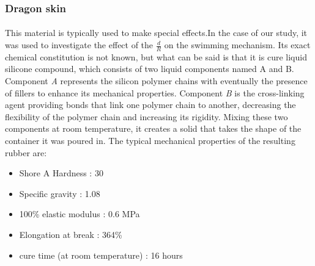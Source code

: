 \subsubsection{Dragon skin} 
\paragraph{}
This material is typically used to make special effects.In the case of our study, it was used to investigate the effect of the $\frac{d}{R}$ on the swimming mechanism. Its exact chemical constitution is not known, but what can be said is that it is cure liquid silicone compound, which consists of two liquid components named A and B. Component \emph{A} represents the silicon polymer chains with eventually the presence of fillers to enhance its mechanical properties. Component \emph{B} is the cross-linking agent providing bonds that link one polymer chain to another, decreasing the flexibility of the polymer chain and increasing its rigidity. Mixing these two components at room temperature, it creates a solid that takes the shape of the container it was poured in.
The typical mechanical properties of the resulting rubber are:
\begin{itemize}
	\item Shore A Hardness : 30 
	\item Specific gravity : 1.08 
	\item 100\% elastic modulus : 0.6 MPa
	\item Elongation at break : 364\%
	\item cure time (at room temperature) : 16 hours
\end{itemize}

